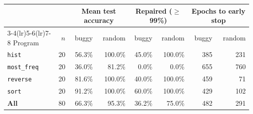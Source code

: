 \begin{tabular}{lrrrrrrr}
\toprule
 & & \multicolumn{2}{c}{Mean test accuracy} & \multicolumn{2}{c}{Repaired ($\geq$99\%)} & \multicolumn{2}{c}{Epochs to early stop} \\
\cmidrule(lr){3-4}\cmidrule(lr){5-6}\cmidrule(lr){7-8}
Program & $n$ & buggy & random & buggy & random & buggy & random \\
\midrule
\texttt{hist} & 20 & 56.3\% & 100.0\% & 45.0\% & 100.0\% & 385 & 231 \\
\texttt{most\_freq} & 20 & 36.0\% & 81.2\% & 0.0\% & 0.0\% & 655 & 760 \\
\texttt{reverse} & 20 & 81.6\% & 100.0\% & 40.0\% & 100.0\% & 459 & 71 \\
\texttt{sort} & 20 & 91.2\% & 100.0\% & 60.0\% & 100.0\% & 429 & 102 \\
\midrule
\textbf{All} & 80 & 66.3\% & 95.3\% & 36.2\% & 75.0\% & 482 & 291 \\
\bottomrule
\end{tabular}
